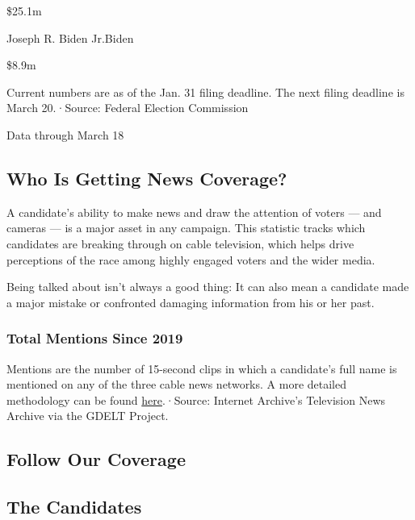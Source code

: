 \$25.1m

Joseph R. Biden Jr.Biden

\$8.9m

Current numbers are as of the Jan. 31 filing deadline. The next filing
deadline is March 20.·Source: Federal Election Commission

Data through March 18

\hypertarget{who-is-getting-news-coverage}{%
\subsection{Who Is Getting News
Coverage?}\label{who-is-getting-news-coverage}}

A candidate's ability to make news and draw the attention of voters ---
and cameras --- is a major asset in any campaign. This statistic tracks
which candidates are breaking through on cable television, which helps
drive perceptions of the race among highly engaged voters and the wider
media.

Being talked about isn't always a good thing: It can also mean a
candidate made a major mistake or confronted damaging information from
his or her past.

\hypertarget{total-mentions-since-2019}{%
\subsubsection{Total Mentions Since
2019}\label{total-mentions-since-2019}}

Mentions are the number of 15-second clips in which a candidate's full
name is mentioned on any of the three cable news networks. A more
detailed methodology can be found
\href{https://blog.gdeltproject.org/the-new-television-explorer-launches/}{here}.·Source:
Internet Archive's Television News Archive via the GDELT Project.

\hypertarget{follow-our-coverage}{%
\subsection{Follow Our Coverage}\label{follow-our-coverage}}

\href{https://www.nytimes3xbfgragh.onion/interactive/2019/us/politics/2020-presidential-candidates.html}{}

\hypertarget{the-candidates}{%
\subsection{The Candidates}\label{the-candidates}}

